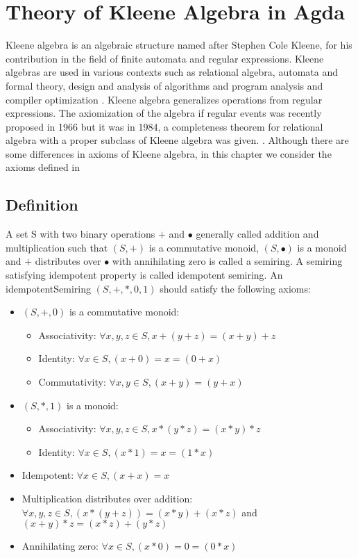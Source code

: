 \chapter{Theory of Kleene Algebra in Agda}
Kleene algebra is an algebraic structure named after Stephen Cole Kleene, for
his contribution in the field of finite automata and regular expressions. Kleene
algebras are used in various contexts such as relational algebra, automata and
formal theory, design and analysis of algorithms and program analysis and
compiler optimization \cite{kozen1997kleene}. Kleene algebra generalizes
operations from regular expressions. The axiomization of the algebra if regular
events was recently proposed in 1966 but it was in 1984, a completeness theorem
for relational algebra with a proper subclass of Kleene algebra was given.
\cite{kozen1994completeness}. Although there are some differences in axioms of
Kleene algebra, in this chapter we consider the axioms defined in
\cite{kozen1994completeness}

\section{Definition}
A set S with two binary operations $+$ and $∙$ generally called addition and
multiplication such that $(S,+)$ is a commutative monoid, $(S,∙)$ is a monoid
and $+$ distributes over $∙$ with annihilating zero is called a semiring. A
semiring satisfying idempotent property is called idempotent semiring. An
idempotentSemiring $(S,+,*,0,1)$ should satisfy the following axioms:
\begin{itemize}
\item $(S,+,0)$ is a commutative monoid:
\begin{itemize}
  \item Associativity: $\forall x,y,z \in S, x + (y + z) = (x + y) + z$
  \item Identity: $\forall x \in S, (x + 0) = x = (0 + x)$
  \item Commutativity: $\forall x,y \in S, (x + y) = (y + x)$
\end{itemize}
\item $(S,*,1)$ is a monoid:
\begin{itemize}
  \item Associativity: $ \forall x,y,z \in S, x * (y*z)  = (x*y)*z$
  \item Identity: $\forall x \in S, (x * 1) = x = (1 * x)$
\end{itemize}
\item Idempotent: $\forall x \in S, (x + x) = x$
\item Multiplication distributes over addition: \(\forall x , y , z \in S, (x * (y + z)) = (x * y) + (x
* z)\) and \( (x + y) * z = (x * z) + (y * z) \)
\item Annihilating zero: \(\forall x \in S, (x * 0) = 0 = (0 * x)\)
\end{itemize}

